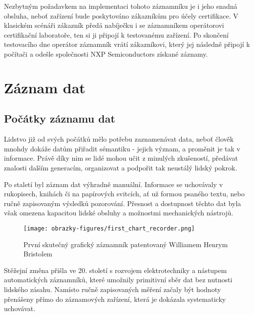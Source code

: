 Nezbytným požadavkem na implementaci tohoto záznamníku je i jeho snadná obsluha, neboť zařízení bude poskytováno zákazníkům pro účely certifikace. V klasickém scénáři zákazník předá nabíječku 
i se záznamníkem operátorovi certifikační laboratoře, ten si ji připojí k testovanému zařízení. Po skončení testovacího dne operátor záznamník vrátí zákazníkovi, který jej následně připojí 
k počítači a odešle společnosti NXP Semiconductors získané záznamy.


\chapter{Záznam dat}
\label{zaznam_dat}

\section{Počátky záznamu dat}
\label{pocatky}
Lidstvo již od svých počátků mělo potřebu zaznamenávat data, neboť člověk mnohdy dokáže datům přiřadit sémantiku - jejich význam, a proměnit je tak v informace. Právě díky nim se lidé mohou 
učit z minulých zkušeností, předávat znalosti dalším generacím, organizovat a podpořit tak neustálý lidský pokrok. 

Po staletí byl záznam dat výhradně manuální. Informace se uchovávaly v rukopisech, knihách či na papírových svitcích, ať už formou psaného textu, nebo ručně zapisovaným výsledků pozorování. 
Přesnost a dostupnost těchto dat byla však omezena kapacitou lidské obsluhy a možnostmi mechanických nástrojů.

\begin{figure}[h] %
    \centering
    \texttt{[image: obrazky-figures/first\_chart\_recorder.png]}
    \caption{První skutečný grafický záznamník patentovaný Williamem Henrym Bristolem \cite{bristol_chart_recorders}}
    \label{fig:chart_recorder}
\end{figure}

Stěžejní změna přišla ve 20. století s rozvojem elektrotechniky a nástupem automatických záznamníků, které umožnily primitivní sběr dat bez nutnosti lidského zásahu. Namísto ručně zapisovaných 
měření začaly být hodnoty přenášeny přímo do záznamových zařízení, která je dokázala systematicky uchovávat. \cite{origin_of_chart_recorders}

